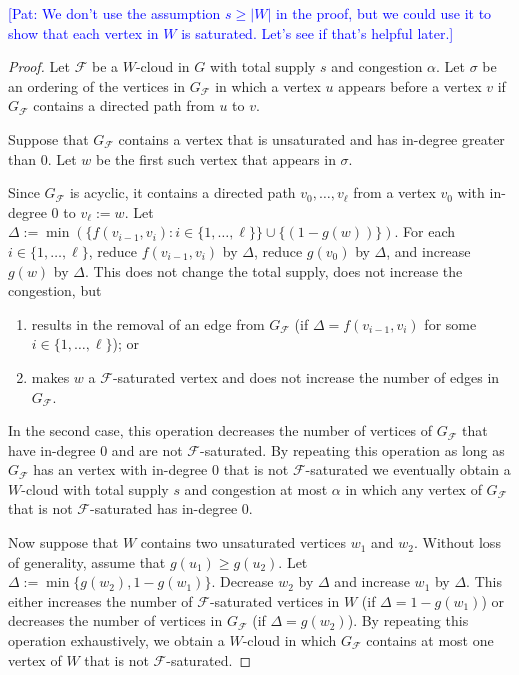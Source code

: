 \documentclass{patmorin}
\newcommand{\pat}[1]{\textcolor{Blue}{[Pat: #1]}}
\begin{document}
\pat{We don't use the assumption $s\ge |W|$ in the proof, but we could use it to show that each vertex in $W$ is saturated.  Let's see if that's helpful later.}

\begin{proof}
  Let $\mathcal{F}$ be a $W$-cloud in $G$ with total supply $s$ and congestion $\alpha$.  Let $\sigma$ be an ordering of the vertices in $G_\mathcal{F}$ in which a vertex $u$ appears before a vertex $v$ if $G_{\mathcal{F}}$ contains a directed path from $u$ to $v$.

  Suppose that $G_{\mathcal{F}}$ contains a vertex that is unsaturated and has in-degree greater than $0$.  Let $w$ be the first such vertex that appears in $\sigma$.

  Since $G_{\mathcal{F}}$ is acyclic, it contains a directed path $v_0,\ldots,v_\ell$ from a vertex $v_0$ with in-degree $0$ to $v_\ell:=w$. Let $\Delta:=\min(\{f(v_{i-1},v_i):i\in\{1,\ldots,\ell\}\}\cup\{(1-g(w))\})$.
  For each $i\in\{1,\ldots,\ell\}$, reduce $f(v_{i-1},v_i)$ by $\Delta$, reduce $g(v_0)$ by $\Delta$, and increase $g(w)$ by $\Delta$.  This does not change the total supply, does not increase the congestion, but
  \begin{enumerate}
     \item results in the removal of an edge from $G_\mathcal{F}$ (if $\Delta=f(v_{i-1},v_i)$ for some $i\in\{1,\ldots,\ell\}$); or
     \item makes $w$ a $\mathcal{F}$-saturated vertex and does not increase the number of edges in $G_\mathcal{F}$.
  \end{enumerate}
   In the second case, this operation decreases the number of vertices of $G_{\mathcal{F}}$ that have in-degree $0$ and are not $\mathcal{F}$-saturated.
   By repeating this operation as long as $G_{\mathcal{F}}$ has an vertex with in-degree $0$ that is not $\mathcal{F}$-saturated we eventually obtain a $W$-cloud with total supply $s$ and congestion at most $\alpha$ in which any vertex of $G_{\mathcal{F}}$ that is not $\mathcal{F}$-saturated has in-degree $0$.

   Now suppose that $W$ contains two unsaturated vertices $w_1$ and $w_2$. Without loss of generality, assume that $g(u_1)\ge g(u_2)$.  Let $\Delta:=\min\{g(w_2),1-g(w_1)\}$.  Decrease $w_2$ by $\Delta$ and increase $w_1$ by $\Delta$.  This either increases the number of $\mathcal{F}$-saturated vertices in $W$ (if $\Delta=1-g(w_1)$) or decreases the number of vertices in $G_\mathcal{F}$ (if $\Delta=g(w_2)$).  By repeating this operation exhaustively, we obtain a $W$-cloud in which $G_{\mathcal{F}}$ contains at most one vertex of $W$ that is not $\mathcal{F}$-saturated.


\end{proof}
\end{document}
